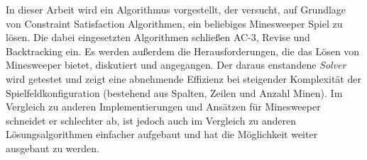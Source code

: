 %
\vspace*{0.4cm}

\noindent 
In dieser Arbeit wird ein Algorithmus vorgestellt, der versucht, auf Grundlage von Constraint Satisfaction Algorithmen, ein beliebiges 
Minesweeper Spiel zu lösen. Die dabei eingesetzten Algorithmen schließen AC-3, Revise und Backtracking ein. Es werden außerdem die
Herausforderungen, die das Lösen von Minesweeper bietet, diskutiert und angegangen. Der daraus enstandene \textit{Solver} wird getestet
und zeigt eine abnehmende Effizienz bei steigender Komplexität der Spielfeldkonfiguration (bestehend aus Spalten, Zeilen und Anzahl Minen).
Im Vergleich zu anderen Implementierungen und Ansätzen für Minesweeper schneidet er schlechter ab, ist jedoch auch im Vergleich zu anderen
Lösungsalgorithmen einfacher aufgebaut und hat die Möglichkeit weiter ausgebaut zu werden.